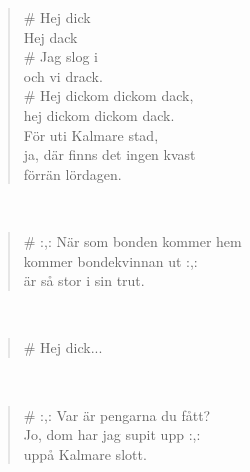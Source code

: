 \noindent\begin{minipage}{\linewidth}
\begin{verse}
	\hspace{0pt-\widthof{\# }}\# Hej dick\\
	Hej dack\\
	\hspace{0pt-\widthof{\# }}\# Jag slog i\\
	och vi drack.\\
	\hspace{0pt-\widthof{\# }}\# Hej dickom dickom dack,\\
	hej dickom dickom dack.\\
	För uti Kalmare stad,\\
	ja, där finns det ingen kvast\\
	förrän lördagen.\\
\end{verse}
\end{minipage}\\[10pt]
\noindent\begin{minipage}{\linewidth}
\begin{verse}
	\hspace{0pt-\widthof{\# }-\widthof{:,: }}\# :,: När som bonden kommer hem\\
	kommer bondekvinnan ut :,:\\
	är så stor i sin trut.\\
\end{verse}
\end{minipage}\\[10pt]
\noindent\begin{minipage}{\linewidth}
\begin{verse}
	\hspace{0pt-\widthof{\# }}\# Hej dick...\\
\end{verse}
\end{minipage}\\[10pt]
\noindent\begin{minipage}{\linewidth}
\begin{verse}
	\hspace{0pt-\widthof{\# }-\widthof{:,: }}\# :,: Var är pengarna du fått?\\
	Jo, dom har jag supit upp :,:\\
	uppå Kalmare slott.\\
\end{verse}
\end{minipage}\\[10pt]
